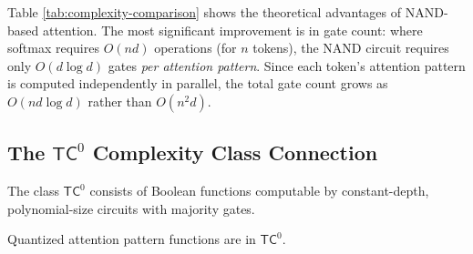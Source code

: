 Table \ref{tab:complexity-comparison} shows the theoretical advantages of NAND-based attention. The most significant improvement is in gate count: where softmax requires $O(nd)$ operations (for $n$ tokens), the NAND circuit requires only $O(d \log d)$ gates \emph{per attention pattern}. Since each token's attention pattern is computed independently in parallel, the total gate count grows as $O(nd \log d)$ rather than $O(n^2 d)$.













\subsection{The $\mathsf{TC}^0$ Complexity Class Connection}













\begin{definition}[$\mathsf{TC}^0$]






The class $\mathsf{TC}^0$ consists of Boolean functions computable by constant-depth, polynomial-size circuits with majority gates.






\end{definition}













\begin{theorem}






Quantized attention pattern functions are in $\mathsf{TC}^0$.






\end{theorem}













